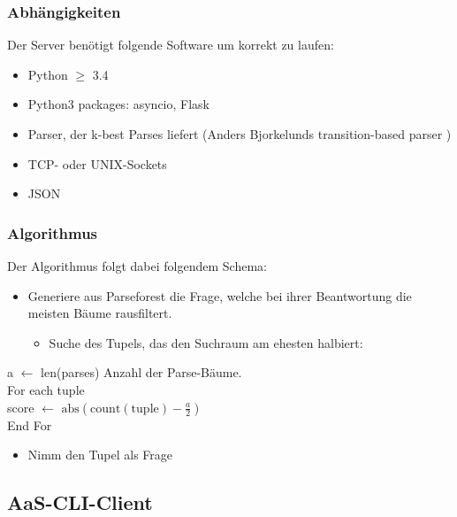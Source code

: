 \documentclass{scrartcl}
\begin{document}
\subsubsection{Abhängigkeiten}
\label{ssub:Server-Abhaengigkeiten}
Der Server benötigt folgende Software um korrekt zu laufen:
    \begin{itemize}
        \item Python $\geq$ 3.4 
        \item Python3 packages: asyncio, Flask
        \item Parser, der k-best Parses liefert (Anders Bjorkelunds transition-based parser )
        \item TCP- oder UNIX-Sockets
        \item JSON
    \end{itemize}

\subsubsection{Algorithmus}
\label{ssub:Algorithmus}

Der Algorithmus folgt dabei folgendem Schema:
    \begin{itemize}
        \item Generiere aus Parseforest die Frage, welche bei ihrer Beantwortung die meisten Bäume rausfiltert.
            \begin{itemize}
                \item Suche des Tupels, das den Suchraum am ehesten halbiert:
            \end{itemize}
    \end{itemize}

        \indent\indent\indent\indent\indent\indent a $\gets$ len(parses) Anzahl der Parse-Bäume. \\
        \indent\indent\indent\indent\indent\indent For each tuple \\
       \indent\indent\indent\indent\indent\indent\indent score $\gets$ $\mathrm{abs}(\mathrm{count(tuple)} - \frac{a}{2})$ \\
        \indent\indent\indent\indent\indent\indent End For

    \begin{itemize}
        \item Nimm den Tupel als Frage
    \end{itemize}

\subsection{AaS-CLI-Client}
\label{sub:AaS-CLI-Client}
\end{document}
